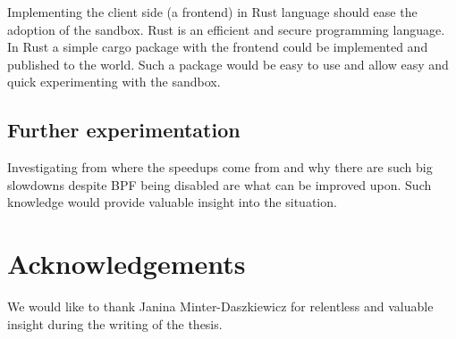 \documentclass[en]{pracamgr}
\begin{document}
Implementing the client side (a frontend) in Rust language should ease the adoption of the sandbox. Rust is an efficient and secure programming language. In Rust a simple cargo package with the frontend could be implemented and published to the world. Such a package would be easy to use and allow easy and quick experimenting with the sandbox.

\subsection{Further experimentation}

Investigating from where the speedups come from and why there are such big slowdowns despite BPF being disabled are what can be improved upon. Such knowledge would provide valuable insight into the situation.

\section{Acknowledgements}

We would like to thank Janina Minter-Daszkiewicz for relentless and valuable insight during the writing of the thesis.

\printbibliography
\end{document}
